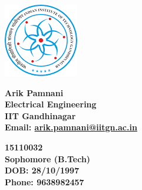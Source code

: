 \documentclass[margin, centered]{res}
\begin{document}
\begin{minipage}{0.2\textwidth}
\includegraphics[scale=0.5]{iitgnlogo.png}
\end{minipage}\begin{minipage}{0.5\textwidth}
\bf {Arik Pamnani}
\\
Electrical Engineering
\\ 
IIT Gandhinagar
\\
Email: \href{mailto:arik.pamnani@iitgn.ac.in}{arik.pamnani@iitgn.ac.in}
\end{minipage}\begin{minipage}{0.3\textwidth}
\bf 15110032
\\
Sophomore (B.Tech)
\\
DOB: 28/10/1997
\\
Phone: 9638982457
\end{minipage}
\end{document}
